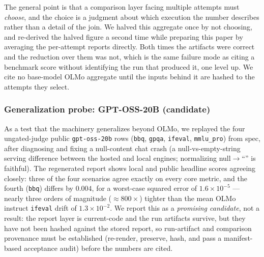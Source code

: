 The general point is that a comparison layer facing multiple attempts must
\emph{choose}, and the choice is a judgment about which execution the number
describes rather than a detail of the join. We halved this aggregate once by not
choosing, and re-derived the halved figure a second time while preparing this
paper by averaging the per-attempt reports directly. Both times the artifacts were
correct and the reduction over them was not, which is the same failure mode as
citing a benchmark score without identifying the run that produced it, one level
up. We cite no base-model OLMo aggregate until the inputs behind it are hashed to
the attempts they select.
\par\smallskip\noindent{}\par\smallskip

\subsubsection{Generalization probe: GPT-OSS-20B (candidate)}
\label{sec:gptoss}
As a test that the machinery generalizes beyond OLMo, we replayed the four
ungated-judge public \texttt{gpt-oss-20b} rows (\texttt{bbq}, \texttt{gpqa},
\texttt{ifeval}, \texttt{mmlu\_pro}) from spec, after diagnosing and fixing a
null-content chat crash (a null-vs-empty-string serving difference between the
hosted and local engines; normalizing null$\to$``'' is faithful). The regenerated
report shows local and public headline scores agreeing closely: three of the four
scenarios agree exactly on every core metric, and the fourth (\texttt{bbq})
differs by $0.004$, for a worst-case squared error of $1.6{\times}10^{-5}$ ---
nearly three orders of magnitude (${\approx}800\times$) tighter than the mean
OLMo instruct \texttt{ifeval} drift of $1.3{\times}10^{-2}$. We report this as a
\emph{promising candidate}, not a result: the report layer is current-code and the
run artifacts survive, but they have not been hashed against the stored report, so
run-artifact and comparison provenance must be established (re-render, preserve,
hash, and pass a manifest-based acceptance audit) before the numbers are cited.
\par\smallskip\noindent{}\par\smallskip

